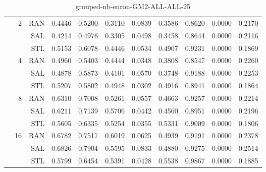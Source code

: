\begin{center}
\begin{table}[htbp]
\begin{tabular}{ | r | r | r | r | r | r | r | r | r | r | r |}
 & \multirow{3}{*}{2} & RAN & 0.4446 & 0.5200 & 0.3110 & 0.0839 & 0.3586 & 0.8620 & 0.0000 & 0.2170\\ \cline{3-11}
 &   & SAL & 0.4214 & 0.4976 & 0.3305 & 0.0498 & 0.3458 & 0.8644 & 0.0000 & 0.2116\\ \cline{3-11}
 &   & STL & 0.5153 & 0.6078 & 0.4446 & 0.0534 & 0.4907 & 0.9231 & 0.0000 & 0.1869\\ \cline{2-11}
 & \multirow{3}{*}{4} & RAN & 0.4960 & 0.5403 & 0.4444 & 0.0348 & 0.3808 & 0.8547 & 0.0000 & 0.2260\\ \cline{3-11}
 &   & SAL & 0.4878 & 0.5873 & 0.4101 & 0.0570 & 0.3748 & 0.9188 & 0.0000 & 0.2253\\ \cline{3-11}
 &   & STL & 0.5207 & 0.5802 & 0.4948 & 0.0302 & 0.4916 & 0.8941 & 0.0000 & 0.1864\\ \cline{2-11}
 & \multirow{3}{*}{8} & RAN & 0.6310 & 0.7008 & 0.5261 & 0.0557 & 0.4663 & 0.9257 & 0.0000 & 0.2214\\ \cline{3-11}
 &   & SAL & 0.6211 & 0.7139 & 0.5706 & 0.0442 & 0.4560 & 0.8951 & 0.0000 & 0.2196\\ \cline{3-11}
 &   & STL & 0.5605 & 0.6335 & 0.5254 & 0.0355 & 0.5331 & 0.9009 & 0.0000 & 0.1806\\ \cline{2-11}
 & \multirow{3}{*}{16} & RAN & 0.6782 & 0.7517 & 0.6019 & 0.0625 & 0.4939 & 0.9191 & 0.0000 & 0.2378\\ \cline{3-11}
 &   & SAL & 0.6826 & 0.7904 & 0.5595 & 0.0833 & 0.4880 & 0.9275 & 0.0000 & 0.2514\\ \cline{3-11}
 &   & STL & 0.5799 & 0.6454 & 0.5391 & 0.0428 & 0.5538 & 0.9867 & 0.0000 & 0.1885\\ \cline{2-11}
\hline
\end{tabular}
\caption{grouped-nb-enron-GM2-ALL-ALL-25}
\end{table}
\end{center}

